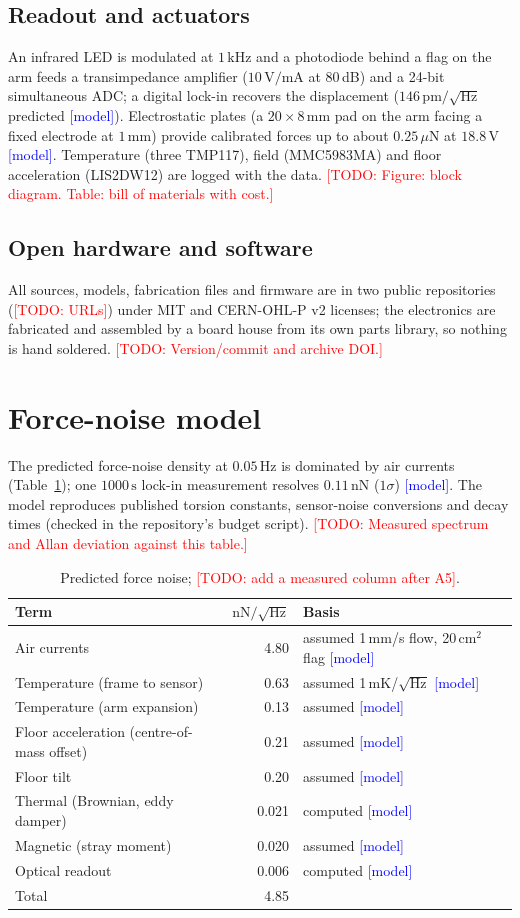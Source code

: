 \documentclass[11pt]{article}
\newcommand{\todo}[1]{\textcolor{red}{[TODO: #1]}}
\newcommand{\model}{\textcolor{blue}{[model]}}
\begin{document}
\subsection{Readout and actuators}
An infrared LED is modulated at $1\,\mathrm{kHz}$ and a photodiode behind a flag on the arm feeds a transimpedance amplifier ($10\,\mathrm{V/mA}$ at 80\,dB) and a 24-bit simultaneous ADC; a digital lock-in recovers the displacement ($146\,\mathrm{pm}/\sqrt{\mathrm{Hz}}$ predicted \model). Electrostatic plates (a $20\times8\,\mathrm{mm}$ pad on the arm facing a fixed electrode at $1\,\mathrm{mm}$) provide calibrated forces up to about $0.25\,\mu\mathrm{N}$ at $18.8\,\mathrm{V}$ \model. Temperature (three TMP117), field (MMC5983MA) and floor acceleration (LIS2DW12) are logged with the data. \todo{Figure: block diagram. Table: bill of materials with cost.}
\subsection{Open hardware and software}
All sources, models, fabrication files and firmware are in two public repositories (\todo{URLs}) under MIT and CERN-OHL-P v2 licenses; the electronics are fabricated and assembled by a board house from its own parts library, so nothing is hand soldered. \todo{Version/commit and archive DOI.}

\section{Force-noise model}
The predicted force-noise density at $0.05\,\mathrm{Hz}$ is dominated by air currents (Table~\ref{tab:noise}); one $1000\,\mathrm{s}$ lock-in measurement resolves $0.11\,\mathrm{nN}$ ($1\sigma$) \model. The model reproduces published torsion constants, sensor-noise conversions and decay times (checked in the repository's budget script). \todo{Measured spectrum and Allan deviation against this table.}
\begin{table}[h]\centering
\begin{tabular}{lrl}\toprule
Term & $\mathrm{nN}/\sqrt{\mathrm{Hz}}$ & Basis\\\midrule
Air currents & 4.80 & assumed 1\,mm/s flow, 20\,cm$^2$ flag \model\\
Temperature (frame to sensor) & 0.63 & assumed 1\,mK/$\sqrt{\mathrm{Hz}}$ \model\\
Temperature (arm expansion) & 0.13 & assumed \model\\
Floor acceleration (centre-of-mass offset) & 0.21 & assumed \model\\
Floor tilt & 0.20 & assumed \model\\
Thermal (Brownian, eddy damper) & 0.021 & computed \model\\
Magnetic (stray moment) & 0.020 & assumed \model\\
Optical readout & 0.006 & computed \model\\\midrule
Total & 4.85 & \\\bottomrule
\end{tabular}\caption{Predicted force noise; \todo{add a measured column after A5}.}\label{tab:noise}
\end{table}
\end{document}
